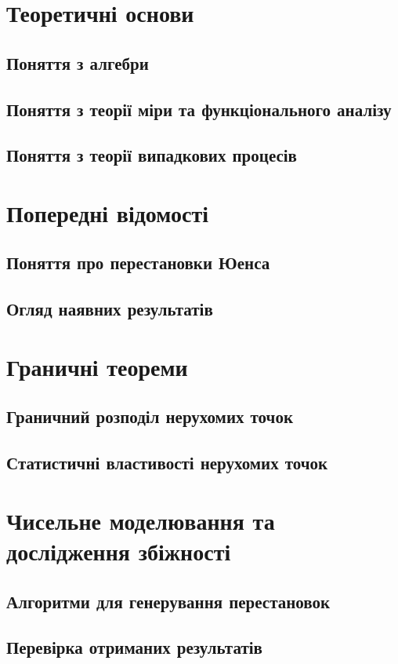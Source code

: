 





\tableofcontents
{}
    
\chapter{Теоретичні основи}
    \section{Поняття з алгебри}
        
    \section{Поняття з теорії міри та функціонального аналізу}
        
    \section{Поняття з теорії випадкових процесів}
        
\chapter{Попередні відомості}
    \section{Поняття про перестановки Юенса}
        
    \section{Огляд наявних результатів}
\chapter{Граничні теореми}
    \section{Граничний розподіл нерухомих точок}
        
    \section{Статистичні властивості нерухомих точок}
        
\chapter{Чисельне моделювання та дослідження збіжності}
    \section{Алгоритми для генерування перестановок}
        
    \section{Перевірка отриманих результатів}
        
\newpage


    
